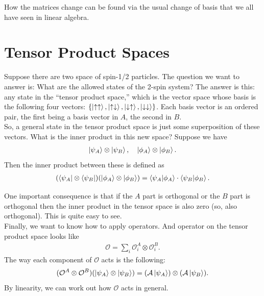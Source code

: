 \documentclass{book}
\theoremstyle{definition}
\begin{document}
How the matrices change can be found via the usual change of basis that we all have seen in linear algebra.\\



\section{Tensor Product Spaces}

Suppose there are two space of spin-1/2 particles. The question we want to answer is: What are the allowed states of the 2-spin system? The answer is this: any state in the ``tensor product space,'' which is the vector space whose basis is the following four vectors: $\{ \ket{\uparrow\uparrow}, \ket{\uparrow\downarrow}, \ket{\downarrow\uparrow}, \ket{\downarrow\downarrow}\}$. Each basis vector is an ordered pair, the first being a basis vector in $A$, the second in $B$. \\


So, a general state in the tensor product space is just some superposition of these vectors. What is the inner product in this new space? Suppose we have
\begin{align}
\ket{\psi_A} \otimes \ket{\psi_B}, \quad \ket{\phi_A} \otimes \ket{\phi_B}.
\end{align}
Then the inner product between these is defined as 
\begin{align}
(\bra{\psi_A} \otimes \bra{\psi_B}) (\ket{\phi_A} \otimes \ket{\phi_B}) = \braket{\psi_A}{\phi_A} \cdot \braket{\psi_B}{\phi_B}.
\end{align}


One important consequence is that if the $A$ part is orthogonal or the $B$ part is orthogonal then the inner product in the tensor space is also zero (so, also orthogonal). This is quite easy to see. \\

Finally, we want to know how to apply operators. And operator on the tensor product space looks like
\begin{align}
\mathcal{O} = \sum_i \mathcal{O}^A_i \otimes \mathcal{O}^B_i.
\end{align}
The way each component of $\mathcal{O}$ acts is the following:
\begin{align}
(\mathcal{O}^A \otimes \mathcal{O}^B) (\ket{\psi_A} \otimes \ket{\psi_B}) = (\mathcal{A} \ket{\psi_A}) \otimes (\mathcal{A} \ket{\psi_B}).
\end{align}
By linearity, we can work out how $\mathcal{O}$ acts in general.\\
\end{document}
